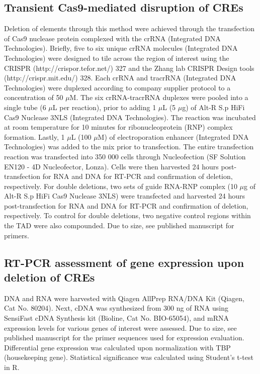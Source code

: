 \subsection{Transient Cas9-mediated disruption of CREs}

Deletion of elements through this method were achieved through the transfection of Cas9 nuclease protein complexed with the crRNA (Integrated DNA Technologies).
Briefly, five to six unique crRNA molecules (Integrated DNA Technologies) were designed to tile across the region of interest using the CRISPR (http://crispor.tefor.net/) 327 and the Zhang lab CRISPR Design tools (http://crispr.mit.edu/) 328.
Each crRNA and tracrRNA (Integrated DNA Technologies) were duplexed according to company supplier protocol to a concentration of 50 $\mu$M.
The six crRNA-tracrRNA duplexes were pooled into a single tube (6 $\mu$L per reaction), prior to adding 1 $\mu$L (5 $\mu$g) of Alt-R \textregistered S.p HiFi Cas9 Nuclease 3NLS (Integrated DNA Technologies).
The reaction was incubated at room temperature for 10 minutes for ribonucleoprotein (RNP) complex formation.
Lastly, 1 $\mu$L (100 $\mu$M) of electroporation enhancer (Integrated DNA Technologies) was added to the mix prior to transfection.
The entire transfection reaction was transfected into 350 000 cells through Nucleofection (SF Solution EN120 - 4D Nucleofector, Lonza).
Cells were then harvested 24 hours post-transfection for RNA and DNA for RT-PCR and confirmation of deletion, respectively.
For double deletions, two sets of guide RNA-RNP complex (10 $\mu$g of Alt-R \textregistered S.p HiFi Cas9 Nuclease 3NLS) were transfected and harvested 24 hours post-transfection for RNA and DNA for RT-PCR and confirmation of deletion, respectively.
To control for double deletions, two negative control regions within the TAD were also compounded.
Due to size, see published manuscript for primers.

\subsection{RT-PCR assessment of gene expression upon deletion of CREs}

DNA and RNA were harvested with Qiagen AllPrep RNA/DNA Kit (Qiagen, Cat No. 80204).
Next, cDNA was synthesized from 300 ng of RNA using SensiFast cDNA Synthesis kit (Bioline, Cat No. BIO-65054), and mRNA expression levels for various genes of interest were assessed.
Due to size, see published manuscript for the primer sequences used for expression evaluation.
Differential gene expression was calculated upon normalization with TBP (housekeeping gene).
Statistical significance was calculated using Student's t-test in R.

